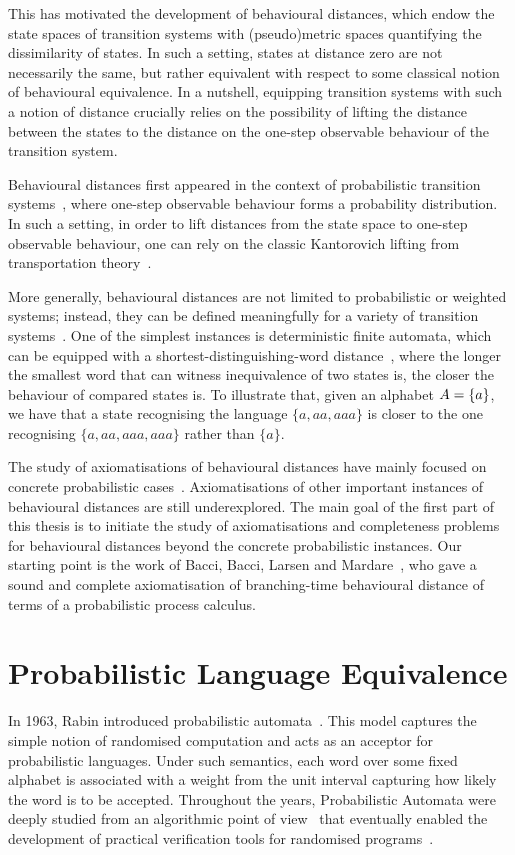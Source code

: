 This has motivated the development of behavioural distances, which endow the state spaces of transition systems with (pseudo)metric spaces quantifying the dissimilarity of states. In such a setting, states at distance zero are not necessarily the same, but rather equivalent with respect to some classical notion of behavioural equivalence. In a nutshell, equipping transition systems with such a notion of distance crucially relies on the possibility of lifting the distance between the states to the distance on the one-step observable behaviour of the transition system.

Behavioural distances first appeared in the context of probabilistic transition systems~\cite{Desharnais:2004:Metrics,Breugel:2001:Towards}, where one-step observable behaviour forms a probability distribution. In such a setting, in order to lift distances from the state space to one-step observable behaviour, one can rely on the classic Kantorovich lifting from transportation theory~\cite{Villani:2009:Optimal}. 

More generally, behavioural distances are not limited to probabilistic or weighted systems; instead, they can be defined meaningfully for a variety of transition systems~\cite{Baldan:2018:Coalgebraic}. One of the simplest instances is deterministic finite automata, which can be equipped with a shortest-distinguishing-word distance~\cite{Bonchi:2018:UpTo}, where the longer the smallest word that can witness inequivalence of two states is, the closer the behaviour of compared states is. To illustrate that, given an alphabet ${A} = \{a\}$, we have that a state recognising the language $\{a,aa, aaa\}$ is closer to the one recognising $\{a,aa,aaa,aaa\}$ rather than $\{a\}$. 

The study of axiomatisations of behavioural distances have mainly focused on concrete probabilistic cases~\cite{Bacci:2018:Bisimilarity,Bacci:2018:TV,Bacci:2018:Algebraic}. Axiomatisations of other important instances of behavioural distances are still underexplored. The main goal of the first part of this thesis is to initiate the study of axiomatisations and completeness problems for behavioural distances beyond the concrete probabilistic instances. Our starting point is the work of Bacci, Bacci, Larsen and Mardare~\cite{Bacci:2018:Bisimilarity}, who gave a sound and complete axiomatisation of branching-time behavioural distance of terms of a probabilistic process calculus.

\section{Probabilistic Language Equivalence}
In 1963, Rabin introduced probabilistic automata~\cite{Rabin:1963:Probabilistic}. This model captures the simple notion of randomised computation and acts as an acceptor for probabilistic languages. Under such semantics, each word over some fixed alphabet is associated with a weight from the unit interval capturing how likely the word is to be accepted. Throughout the years, Probabilistic Automata were deeply studied from an algorithmic point of view~\cite{Kiefer:2011:Language} that eventually enabled the development of practical verification tools for randomised programs~\cite{Kiefer:2012:APEX}. 

